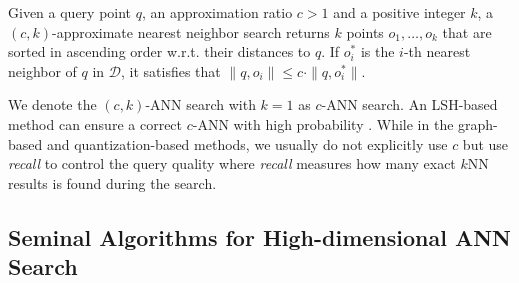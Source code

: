 \documentclass[11pt]{article}
\newcommand{\DD}{\mathrm{\mathcal{D}}}
\def\cred{\textcolor{red}}
\begin{document}
\begin{definition}\label{bolong_df:ckann}
Given a query point $q$, an approximation ratio $c>1$ and a positive integer $k$, a $(c,k)$-approximate nearest neighbor search returns $k$ points $o_1, \ldots, o_k$ that are sorted in ascending order w.r.t. their distances to $q$. If $o_i^*$ is the $i$-th nearest neighbor of $q$ in $\DD$, it satisfies that $ \|q, o_i\| \leq c\cdot\|q, o_i^*\|$.
\end{definition}

We denote the $(c,k)$-ANN search with $k=1$ as $c$-ANN search. An LSH-based method can ensure a correct $c$-ANN with high probability \cite{DBLP:conf/sigmod/TaoYSK09,DBLP:conf/icde/TianZZ22}. While in the graph-based and quantization-based methods, we usually do not explicitly use $c$ but use \textit{recall} to control the query quality where \textit{recall} measures how many exact $k$NN results is found during the search. 

\subsection{Seminal Algorithms for High-dimensional ANN Search}
\end{document}
